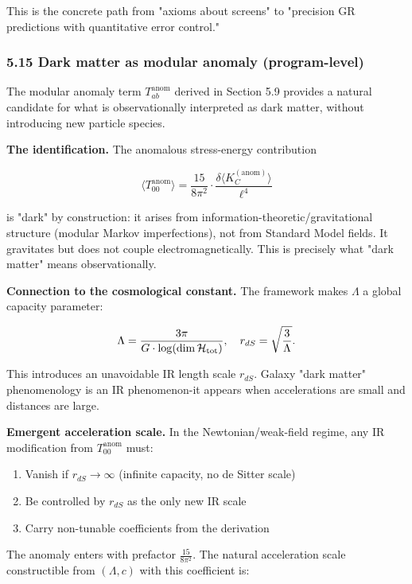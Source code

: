This is the concrete path from "axioms about screens" to "precision GR predictions with quantitative error control."

\subsubsection{5.15 Dark matter as modular anomaly (program-level)}\label{515-dark-matter-as-modular-anomaly-program-level}

The modular anomaly term \(T_{ab}^{\mathrm{anom}}\) derived in Section 5.9 provides a natural candidate for what is observationally interpreted as dark matter, without introducing new particle species.

\textbf{The identification.} The anomalous stress-energy contribution

\[
\langle T_{00}^{\mathrm{anom}} \rangle
= \frac{15}{8\pi^2} \cdot \frac{\delta \langle K_C^{\mathrm{(anom)}} \rangle}{\ell^4}
\]

is "dark" by construction: it arises from information-theoretic/gravitational structure (modular Markov imperfections), not from Standard Model fields. It gravitates but does not couple electromagnetically. This is precisely what "dark matter" means observationally.

\textbf{Connection to the cosmological constant.} The framework makes \(\Lambda\) a global capacity parameter:

\[
\Lambda = \frac{3\pi}{G \cdot \log(\dim \mathcal{H}_{\rm tot})},
\quad
r_{dS} = \sqrt{\frac{3}{\Lambda}}.
\]

This introduces an unavoidable IR length scale \(r_{dS}\). Galaxy "dark matter" phenomenology is an IR phenomenon-it appears when accelerations are small and distances are large.

\textbf{Emergent acceleration scale.} In the Newtonian/weak-field regime, any IR modification from \(T_{00}^{\mathrm{anom}}\) must:

\begin{enumerate}
\def\labelenumi{\arabic{enumi}.}
\tightlist
\item
  Vanish if \(r_{dS} \to \infty\) (infinite capacity, no de Sitter scale)
\item
  Be controlled by \(r_{dS}\) as the only new IR scale
\item
  Carry non-tunable coefficients from the derivation
\end{enumerate}

The anomaly enters with prefactor \(\frac{15}{8\pi^2}\). The natural acceleration scale constructible from \((\Lambda, c)\) with this coefficient is:

